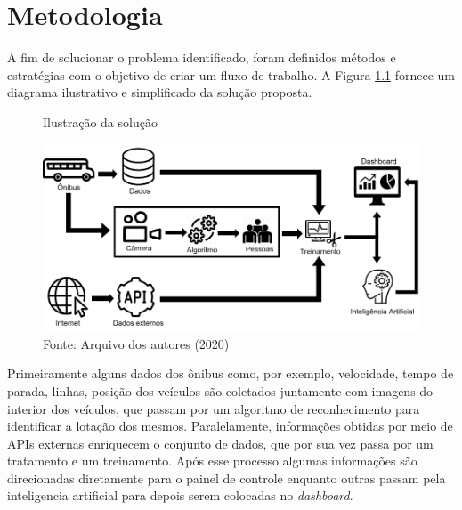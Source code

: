 \chapter{Metodologia}
\label{Cap:MateriaisMetodos}

\indent
\par A fim de solucionar o problema identificado, foram definidos métodos e estratégias com o objetivo de criar um fluxo de trabalho. A Figura \ref{DiagramaDeBlocosIcones} fornece um diagrama ilustrativo e simplificado da solução proposta.

\begin{figure}[H]
    \centering
    \caption{Ilustração da solução}
    \includegraphics[width=1.0\linewidth]{Imagens/DiagramaDeBlocosIcones.png}
    \caption*{Fonte: Arquivo dos autores (2020)}
    \label{DiagramaDeBlocosIcones}
\end{figure}

\indent
\par Primeiramente alguns dados dos ônibus como, por exemplo, velocidade, tempo de parada, linhas, posição dos veículos são coletados juntamente com imagens do interior dos veículos, que passam por um algoritmo de reconhecimento para identificar a lotação dos mesmos. Paralelamente, informações obtidas por meio de APIs externas enriquecem o conjunto de dados, que por sua vez passa por um tratamento e um treinamento. Após esse processo algumas informações são direcionadas diretamente para o painel de controle enquanto outras passam pela inteligencia artificial para depois serem colocadas no \textit{dashboard}.

